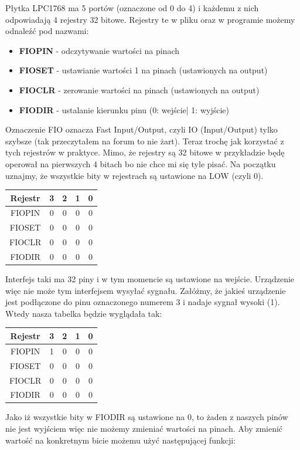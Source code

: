 \documentclass[11pt]{article}
\begin{document}
Płytka LPC1768 ma 5 portów (oznaczone od 0 do 4) i każdemu z nich
odpowiadają 4 rejestry 32 bitowe. Rejestry te w pliku oraz w programie możemy
odnaleźć pod nazwami:
\begin{itemize}
    \item \textbf{FIOPIN} - odczytywanie wartości na pinach
    \item \textbf{FIOSET} - ustawianie wartości 1 na pinach (ustawionych na output)
    \item \textbf{FIOCLR} - zerowanie wartości na pinach (ustawionych na output)
    \item \textbf{FIODIR} - ustalanie kierunku pinu (0: wejście| 1: wyjście)
\end{itemize}
Oznaczenie FIO oznacza Fast Input/Output, czyli IO (Input/Output) tylko szybsze
(tak przeczytałem na forum to nie żart). Teraz trochę jak korzystać z tych rejestrów w praktyce.
Mimo, że rejestry są 32 bitowe w przykładzie będę operował na pierwszych 4 bitach
bo nie chce mi się tyle pisać.
Na początku uznajmy, że wszystkie bity w rejestrach są ustawione na LOW (czyli 0).
\begin{table}[H]
    \centering
    \begin{tabular}{|c|c|c|c|c|}
        \hline
        Rejestr & 3 & 2 & 1 & 0 \\ \hline
        FIOPIN & 0 & 0 & 0 & 0 \\ \hline
        FIOSET & 0 & 0 & 0 & 0 \\ \hline
        FIOCLR & 0 & 0 & 0 & 0 \\ \hline
        FIODIR & 0 & 0 & 0 & 0 \\ \hline
    \end{tabular}
\end{table}
Interfejs taki ma 32 piny i w tym momencie są ustawione na wejście. Urządzenie więc
nie może tym interfejsem wysyłać sygnału. Załóżmy, że jakieś urządzenie jest podłączone
do pinu oznaczonego numerem 3 i nadaje sygnał wysoki (1). Wtedy nasza tabelka będzie wyglądała tak:
\begin{table}[H]
    \centering
    \begin{tabular}{|c|c|c|c|c|}
        \hline
        Rejestr & 3 & 2 & 1 & 0 \\ \hline
        FIOPIN & 1 & 0 & 0 & 0 \\ \hline
        FIOSET & 0 & 0 & 0 & 0 \\ \hline
        FIOCLR & 0 & 0 & 0 & 0 \\ \hline
        FIODIR & 0 & 0 & 0 & 0 \\ \hline
    \end{tabular}
\end{table}
\newpage
Jako iż wszystkie bity w FIODIR są ustawione na 0, to żaden z naszych pinów nie jest
wyjściem więc nie możemy zmieniać wartości na pinach. Aby zmienić wartość na konkretnym bicie
możemu użyć następującej funkcji:
\end{document}
